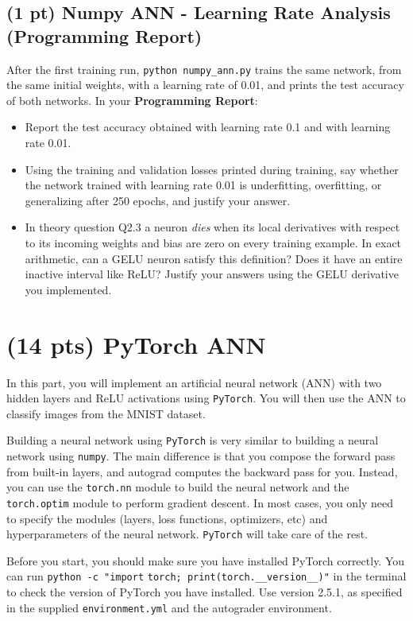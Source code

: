 \documentclass[11pt]{exam}
\begin{document}
\subsection{(1 pt) Numpy ANN - Learning Rate Analysis (Programming Report)}

After the first training run, \verb|python numpy_ann.py| trains the same network, from the same initial weights, with a learning rate of 0.01, and prints the test accuracy of both networks. In your \textbf{Programming Report}:
\begin{itemize}
    \item Report the test accuracy obtained with learning rate 0.1 and with learning rate 0.01.
    \item Using the training and validation losses printed during training, say whether the network trained with learning rate 0.01 is underfitting, overfitting, or generalizing after 250 epochs, and justify your answer.
    \item In theory question Q2.3 a neuron \emph{dies} when its local derivatives with respect to its incoming weights and bias are zero on every training example. In exact arithmetic, can a GELU neuron satisfy this definition? Does it have an entire inactive interval like ReLU? Justify your answers using the GELU derivative you implemented.
\end{itemize}

\section{(14 pts) PyTorch ANN}

In this part, you will implement an artificial neural network (ANN) with two hidden layers and ReLU activations using \verb|PyTorch|. You will then use the ANN to classify images from the MNIST dataset.

Building a neural network using \verb|PyTorch| is very similar to building a neural network using \verb|numpy|. The main difference is that you compose the forward pass from built-in layers, and autograd computes the backward pass for you. Instead, you can use the \verb|torch.nn| module to build the neural network and the \verb|torch.optim| module to perform gradient descent. In most cases, you only need to specify the modules (layers, loss functions, optimizers, etc) and hyperparameters of the neural network. \verb|PyTorch| will take care of the rest.

Before you start, you should make sure you have installed PyTorch correctly. You can run \verb|python -c "import| \verb|torch; print(torch.__version__)"| in the terminal to check the version of PyTorch you have installed. Use version 2.5.1, as specified in the supplied \verb|environment.yml| and the autograder environment.
\end{document}
